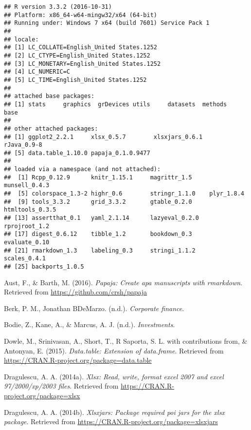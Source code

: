 \documentclass[english,man]{apa6}
\begin{document}
\begin{verbatim}
## R version 3.3.2 (2016-10-31)
## Platform: x86_64-w64-mingw32/x64 (64-bit)
## Running under: Windows 7 x64 (build 7601) Service Pack 1
## 
## locale:
## [1] LC_COLLATE=English_United States.1252 
## [2] LC_CTYPE=English_United States.1252   
## [3] LC_MONETARY=English_United States.1252
## [4] LC_NUMERIC=C                          
## [5] LC_TIME=English_United States.1252    
## 
## attached base packages:
## [1] stats     graphics  grDevices utils     datasets  methods   base     
## 
## other attached packages:
## [1] ggplot2_2.2.1     xlsx_0.5.7        xlsxjars_0.6.1    rJava_0.9-8      
## [5] data.table_1.10.0 papaja_0.1.0.9477
## 
## loaded via a namespace (and not attached):
##  [1] Rcpp_0.12.9      knitr_1.15.1     magrittr_1.5     munsell_0.4.3   
##  [5] colorspace_1.3-2 highr_0.6        stringr_1.1.0    plyr_1.8.4      
##  [9] tools_3.3.2      grid_3.3.2       gtable_0.2.0     htmltools_0.3.5 
## [13] assertthat_0.1   yaml_2.1.14      lazyeval_0.2.0   rprojroot_1.2   
## [17] digest_0.6.12    tibble_1.2       bookdown_0.3     evaluate_0.10   
## [21] rmarkdown_1.3    labeling_0.3     stringi_1.1.2    scales_0.4.1    
## [25] backports_1.0.5
\end{verbatim}

\setlength{\parindent}{-0.5in} \setlength{\leftskip}{0.5in}

\hypertarget{refs}{}
\hypertarget{ref-R-papaja}{}
Aust, F., \& Barth, M. (2016). \emph{Papaja: Create apa manuscripts with
rmarkdown}. Retrieved from \url{https://github.com/crsh/papaja}

\hypertarget{ref-berkdemarzo}{}
Berk, P. M., Jonathan BDeMarzo. (n.d.). \emph{Corporate finance}.

\hypertarget{ref-bodie}{}
Bodie, Z., Kane, A., \& Marcus, A. J. (n.d.). \emph{Investments}.

\hypertarget{ref-R-data.table}{}
Dowle, M., Srinivasan, A., Short, T., R Saporta, S. L. with
contributions from, \& Antonyan, E. (2015). \emph{Data.table: Extension
of data.frame}. Retrieved from
\url{https://CRAN.R-project.org/package=data.table}

\hypertarget{ref-R-xlsx}{}
Dragulescu, A. A. (2014a). \emph{Xlsx: Read, write, format excel 2007
and excel 97/2000/xp/2003 files}. Retrieved from
\url{https://CRAN.R-project.org/package=xlsx}

\hypertarget{ref-R-xlsxjars}{}
Dragulescu, A. A. (2014b). \emph{Xlsxjars: Package required poi jars for
the xlsx package}. Retrieved from
\url{https://CRAN.R-project.org/package=xlsxjars}
\end{document}
